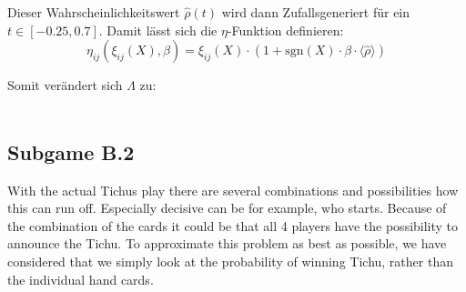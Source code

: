 Dieser Wahrscheinlichkeitswert $\hat{\rho}(t)$ wird dann Zufallsgeneriert für ein $t\in [-0.25,0.7]$. Damit lässt sich die $\eta$-Funktion definieren:
\begin{equation*}
\eta_{ij}(\xi_{ij}(X),\beta) = \xi_{ij}(X)\cdot(1+\mathrm{sgn}(X)\cdot\beta\cdot\langle\widehat{\rho}\rangle)
\end{equation*}


Somit verändert sich $\Lambda$ zu:
\\ \\
\noindent{}

\subsection{Subgame B.2}
With the actual Tichus play there are several combinations and possibilities how this can run off. Especially decisive can be for example, who starts. Because of the combination of the cards it could be that all 4 players have the possibility to announce the Tichu. To approximate this problem as best as possible, we have considered that we simply look at the probability of winning Tichu, rather than the individual hand cards.


